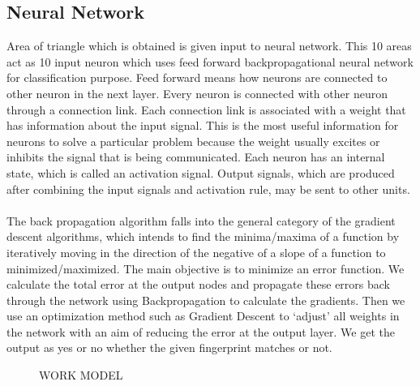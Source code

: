 \documentclass[a4paper, 12pt]{article}
\begin{document}
\subsection{Neural Network}
Area of triangle which is obtained is given input to neural network. This 10 areas act as 10 input neuron which uses feed forward backpropagational neural network for classification purpose. Feed forward means how neurons are connected to other neuron in the next layer. Every neuron is connected with other neuron through a connection link. Each connection link is associated with a weight that has information about the input signal. This is the most useful information for neurons to solve a particular problem because the weight usually excites or inhibits the signal that is being communicated. Each neuron has an internal state, which is called an activation signal. Output signals, which are produced after combining the input signals and activation rule, may be sent to other units.\\\\
The back propagation algorithm falls into the general category  of  the  gradient  descent  algorithms,  which  intends  to  find  the  minima/maxima  of  a  function  by  iteratively  moving  in  the  direction  of  the  negative  of  a slope  of  a  function  to minimized/maximized.  The main objective is to minimize an error function. We calculate the total error at the output nodes and propagate these errors back through the network using Backpropagation to calculate the gradients. Then we use an optimization method such as Gradient Descent to ‘adjust’ all weights in the network with an aim of reducing the error at the output layer. We  get the output as yes or no whether the given fingerprint matches or not.
\begin{figure}[h]
\begin{center}
\caption{WORK MODEL}
\label {f1}
\end{center}
\end{figure}
\end{document}
